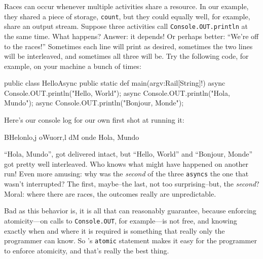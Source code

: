 Races can occur whenever multiple activities share a resource.  In our example,
they shared a piece of storage, {\tt count}, but they could equally well, for
example, share an output stream.  Suppose three activities
call {\tt Console.OUT.println} at the same time.  What happens?  Answer:
it depends! Or perhaps better: ``We're off to the races!''  Sometimes each line
will print as desired, sometimes the two lines will be interleaved, and
sometimes all three will be. Try the following code, for example, on your
machine a bunch of times:
\begin{xten}
public class HelloAsync {
   public static def main(argv:Rail[String]!) {
      async Console.OUT.println("Hello, World");
      async Console.OUT.println("Hola, Mundo");
      async Console.OUT.println("Bonjour, Monde");
   }
}
\end{xten}
Here's our console log for our own first shot at running it:
\begin{xten}
BHelonlo,j oWuorr,l dM
onde
Hola, Mundo
\end{xten}
``Hola, Mundo'', got delivered intact, but ``Hello, World'' and
``Bonjour, Monde'' got pretty well interleaved.  Who knows what might have
happened on another run!  Even more amusing: why was the {\em second} of the
three {\tt asyncs} the one that wasn't interrupted?  The first, maybe--the last,
not too surprising--but, the {\em second}?  Moral: where there are races, the
outcomes really are unpredictable. 

Bad as this behavior is, it is all that \Xten{} can reasonably
guarantee, because enforcing atomicity---on calls to {\tt Console.OUT},
for example---is not free, and knowing exactly when and where it is required is
something that really only the programmer can  know. So \Xten's {\tt atomic}
statement makes it easy for the programmer to enforce atomicity, and that's
really the best thing.

